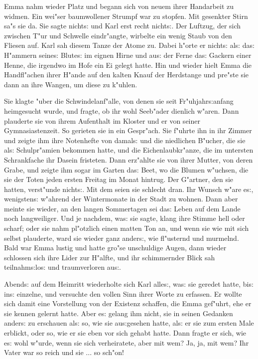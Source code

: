 \documentclass[oneside,12pt]{book}
\newcommand{\s}{s:}%
\begin{document}
Emma nahm wieder Platz und begann sich von neuem ihrer Handarbeit
zu widmen. Ein wei"ser baumwollener Strumpf war zu stopfen. Mit
gesenkter Stirn sa"s sie da. Sie sagte nicht{\s} und Karl erst
recht nicht{\s}. Der Luft\/zug, der sich zwischen T"ur und Schwelle
eindr"angte, wirbelte ein wenig Staub von den Fliesen auf. Karl
sah diesem Tanze der Atome zu. Dabei h"orte er nicht{\s} al{\s}
da{\s} H"ammern seine{\s} Blute{\s} im eignen Hirne und au{\s} der
Ferne da{\s} Gackern einer Henne, die irgendwo im Hofe ein Ei
gelegt hatte. Hin und wieder hielt Emma die Handfl"achen ihrer
H"ande auf den kalten Knauf der Herdstange und pre"ste sie dann an
ihre Wangen, um diese zu k"uhlen.

Sie klagte "uber die Schwindelanf"alle, von denen sie seit
Fr"uhjahr{\s}anfang heimgesucht wurde, und fragte, ob ihr wohl
Seeb"ader dienlich w"aren. Dann plauderte sie von ihrem Aufenthalt
im Kloster und er von seiner Gymnasiastenzeit. So gerieten sie in
ein Gespr"ach. Sie f"uhrte ihn in ihr Zimmer und zeigte ihm ihre
Notenhefte von damal{\s} und die niedlichen B"ucher, die sie
al{\s} Schulpr"amien bekommen hatte, und die Eichenlaubkr"anze,
die im untersten Schrankfache ihr Dasein fristeten. Dann erz"ahlte
sie von ihrer Mutter, von deren Grabe, und zeigte ihm sogar im
Garten da{\s} Beet, wo die Blumen w"uchsen, die sie der Toten
jeden ersten Freitag im Monat hintrug. Der G"artner, den sie
hatten, verst"unde nicht{\s}. Mit dem seien sie schlecht dran. Ihr
Wunsch w"are e{\s}, wenigsten{\s} w"ahrend der Wintermonate in der
Stadt zu wohnen. Dann aber meinte sie wieder, an den langen
Sommertagen sei da{\s} Leben auf dem Lande noch langweiliger. Und
je nachdem, wa{\s} sie sagte, klang ihre Stimme hell oder scharf;
oder sie nahm pl"otzlich einen matten Ton an, und wenn sie wie mit
sich selbst plauderte, ward sie wieder ganz ander{\s}, wie
fl"usternd und murmelnd. Bald war Emma lustig und hatte gro"se
unschuldige Augen, dann wieder schlossen sich ihre Lider zur
H"alfte, und ihr schimmernder Blick sah teilnahm{\s}lo{\s} und
traumverloren au{\s}.

Abend{\s} auf dem Heimritt wiederholte sich Karl alle{\s}, wa{\s}
sie geredet hatte, bi{\s} in{\s} einzelne, und versuchte den
vollen Sinn ihrer Worte zu erfassen. Er wollte sich damit eine
Vorstellung von der Existenz schaffen, die Emma gef"uhrt, ehe er
sie kennen gelernt hatte. Aber e{\s} gelang ihm nicht, sie in
seinen Gedanken ander{\s} zu erschauen al{\s} so, wie sie
au{\s}gesehen hatte, al{\s} er sie zum ersten Male erblickt, oder
so, wie er sie eben vor sich gehabt hatte. Dann fragte er sich,
wie e{\s} wohl w"urde, wenn sie sich verheiratete, aber mit wem?
Ja, ja, mit wem? Ihr Vater war so reich und sie ... so sch"on!
\end{document}
